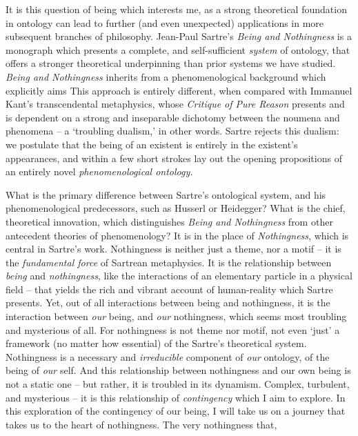 It is this question of being which interests me, as a strong theoretical foundation in ontology can lead to further (and even unexpected) applications in more subsequent branches of philosophy. Jean-Paul Sartre's \emph{Being and Nothingness} is a monograph which presents a complete, and self-sufficient \emph{system} of ontology, that offers a stronger theoretical underpinning than prior systems we have studied. \emph{Being and Nothingness} inherits from a phenomenological background which explicitly aims  This approach is entirely different, when compared with Immanuel Kant's transcendental metaphysics, whose \emph{Critique of Pure Reason} presents and is dependent on a strong and inseparable dichotomy between the noumena and phenomena -- a \enquote*{troubling dualism,} in other words. Sartre rejects this dualism: we postulate that the being of an existent is entirely in the existent's appearances, and within a few short strokes lay out the opening propositions of an entirely novel \emph{phenomenological ontology.}


What is the primary difference between Sartre's ontological system, and his phenomenological predecessors, such as Husserl or Heidegger? What is the chief, theoretical innovation, which distinguishes \emph{Being and Nothingness} from other antecedent theories of phenomenology? It is in the place of \emph{Nothingness}, which is central in Sartre's work. Nothingness is neither just a theme, nor a motif -- it is the \emph{fundamental force} of Sartrean metaphysics. It is the relationship between \emph{being} and \emph{nothingness}, like the interactions of an elementary particle in a physical field -- that yields the rich and vibrant account of human-reality which Sartre presents. Yet, out of all interactions between being and nothingness, it is the interaction between \emph{our} being, and \emph{our} nothingness, which seems most troubling and mysterious of all. For nothingness is not theme nor motif, not even \enquote*{just} a framework (no matter how essential) of the Sartre's theoretical system. Nothingness is a necessary and \emph{irreducible} component of \emph{our} ontology, of the being of \emph{our} self. And this relationship between nothingness and our own being is not a static one -- but rather, it is troubled in its dynamism. Complex, turbulent, and mysterious -- it is this relationship of \emph{contingency} which I aim to explore. In this exploration of the contingency of our being, I will take us on a journey that takes us to the heart of nothingness. The very nothingness that, 